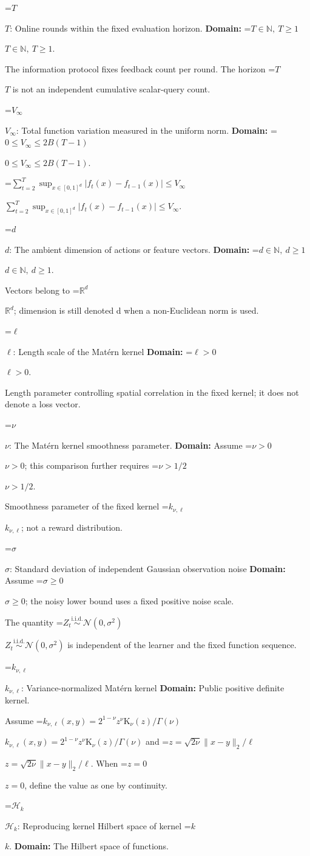 \documentclass[10pt,a4paper]{article}
\newcommand{\AtlasMath}[1]{\par\begingroup\centering\setbox0=\hbox{$\displaystyle #1$}\ifdim\wd0>1.4\linewidth\typeout{ATLAS WIDE FORMULA: \the\wd0}\fi\ifdim\wd0>\linewidth\resizebox{\linewidth}{!}{\box0}\else\box0\fi\par\endgroup}
\newcommand{\AtlasInlineMath}[1]{\begingroup\setbox0=\hbox{$#1$}\ifdim\wd0>.4\linewidth\endgroup\AtlasMath{#1}\else\endgroup$#1$\fi}
\begin{document}
\AtlasInlineMath{T}: Online rounds within the fixed evaluation horizon. \textbf{Domain:} \AtlasInlineMath{T\in\mathbb N,\ T\ge1}.

The information protocol fixes feedback count per round. The horizon \AtlasInlineMath{T} is not an independent cumulative scalar-query count.

\AtlasInlineMath{V_\infty}: Total function variation measured in the uniform norm. \textbf{Domain:} \AtlasInlineMath{0\le V_\infty\le2B(T-1)}.

\AtlasInlineMath{\sum_{t=2}^T\sup_{x\in[0,1]^d}|f_t(x)-f_{t-1}(x)|\le V_\infty}.

\AtlasInlineMath{d}: The ambient dimension of actions or feature vectors. \textbf{Domain:} \AtlasInlineMath{d\in\mathbb N,\ d\ge1}.

Vectors belong to \AtlasInlineMath{\mathbb R^d}; dimension is still denoted d when a non-Euclidean norm is used.

\AtlasInlineMath{\ell}: Length scale of the Matérn kernel \textbf{Domain:} \AtlasInlineMath{\ell>0}.

Length parameter controlling spatial correlation in the fixed kernel; it does not denote a loss vector.

\AtlasInlineMath{\nu}: The Matérn kernel smoothness parameter. \textbf{Domain:} Assume \AtlasInlineMath{\nu>0}; this comparison further requires \AtlasInlineMath{\nu>1/2}.

Smoothness parameter of the fixed kernel \AtlasInlineMath{k_{\nu,\ell}}; not a reward distribution.

\AtlasInlineMath{\sigma}: Standard deviation of independent Gaussian observation noise \textbf{Domain:} Assume \AtlasInlineMath{\sigma\ge0}; the noisy lower bound uses a fixed positive noise scale.

The quantity \AtlasInlineMath{Z_t\overset{\mathrm{i.i.d.}}\sim\mathcal N(0,\sigma^2)} is independent of the learner and the fixed function sequence.

\AtlasInlineMath{k_{\nu,\ell}}: Variance-normalized Matérn kernel \textbf{Domain:} Public positive definite kernel.

Assume \AtlasInlineMath{k_{\nu,\ell}(x,y)=2^{1-\nu}z^\nu\mathrm K_\nu(z)/\Gamma(\nu)} and \AtlasInlineMath{z=\sqrt{2\nu}\|x-y\|_2/\ell}. When \AtlasInlineMath{z=0}, define the value as one by continuity.

\AtlasInlineMath{\mathcal H_k}: Reproducing kernel Hilbert space of kernel \AtlasInlineMath{k}. \textbf{Domain:} The Hilbert space of functions.
\end{document}
